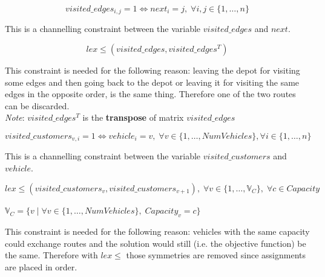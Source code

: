 \documentclass[../main.tex]{subfiles}
\begin{document}
\begin{center}
    \begin{equation}
        visited\_edges_{i,j} = 1 \Leftrightarrow next_i = j, \; \forall i,j \in \{1,\dots,n\}
    \end{equation}
\end{center}
This is a channelling constraint between the variable $visited\_edges$ and $next$.

\begin{center} %
    \begin{equation}
        lex\leq(visited\_edges, visited\_edges^T)
    \end{equation}
\end{center}
This constraint is needed for the following reason: leaving the depot for visiting some edges and then going back to the depot or leaving it for visiting the same edges in the opposite order, is the same thing. Therefore one of the two routes can be discarded.\\
\textit{Note}: $ visited\_edges^T$ is the \textbf{transpose} of matrix $visited\_edges$

\begin{center}
    \begin{equation}
        visited\_customers_{v,i} = 1 \Leftrightarrow vehicle_i = v, \; \forall v \in \{1,\dots,NumVehicles\}, \forall i \in \{1,\dots,n\}
    \end{equation}
\end{center}
This is a channelling constraint between the variable $visited\_customers$ and $vehicle$.

\begin{center}
    \begin{equation}
        lex\leq(visited\_customers_{v}, visited\_customers_{v+1}), \; \forall v \in \{1,\dots,\mathbb{V}_{C}\}, \; \forall c \in Capacity
    \end{equation}\\
    \begin{math}
        \mathbb{V}_{C} = \{v \; | \; \forall v \in \{1,\dots,NumVehicles\}, \; Capacity_v = c\}
    \end{math}
\end{center}
This constraint is needed for the following reason: vehicles with the same capacity could exchange routes and the solution would still (i.e. the objective function) be the same. Therefore with $lex\leq$ those symmetries are removed since assignments are placed in order.
\end{document}
